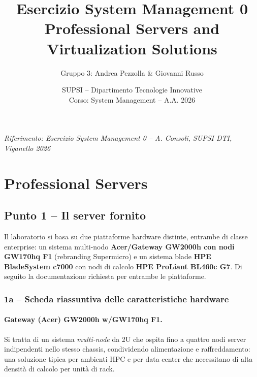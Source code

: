 \documentclass[11pt,a4paper]{article}
\title{\textbf{Esercizio System Management 0}\\[4pt]\Large Professional Servers and Virtualization Solutions}
\author{Gruppo 3: Andrea Pezzolla \& Giovanni Russo}
\date{SUPSI -- Dipartimento Tecnologie Innovative\\Corso: System Management -- A.A. 2026}
\begin{document}
\maketitle
\thispagestyle{empty}

\begin{center}
\textit{Riferimento: Esercizio System Management 0 -- A. Consoli, SUPSI DTI, Viganello 2026}
\end{center}

\vspace{1cm}

\section{Professional Servers}

\subsection{Punto 1 -- Il server fornito}

Il laboratorio si basa su due piattaforme hardware distinte, entrambe di classe enterprise: un sistema multi-nodo \textbf{Acer/Gateway GW2000h con nodi GW170hq F1} (rebranding Supermicro) e un sistema blade \textbf{HPE BladeSystem c7000} con nodi di calcolo \textbf{HPE ProLiant BL460c G7}. Di seguito la documentazione richiesta per entrambe le piattaforme.

\subsubsection{1a -- Scheda riassuntiva delle caratteristiche hardware}

\paragraph{Gateway (Acer) GW2000h w/GW170hq F1.}
Si tratta di un sistema \emph{multi-node} da 2U che ospita fino a quattro nodi server indipendenti nello stesso chassis, condividendo alimentazione e raffreddamento: una soluzione tipica per ambienti HPC e per data center che necessitano di alta densità di calcolo per unità di rack.
\end{document}

